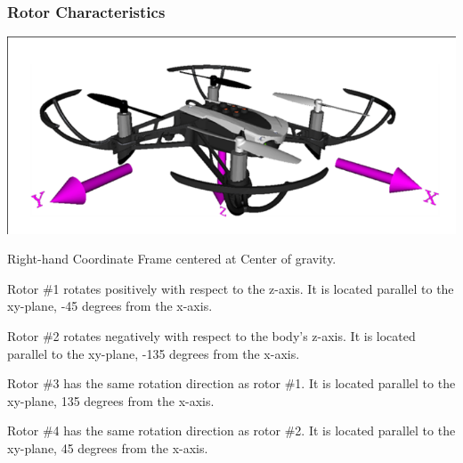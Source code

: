 \documentclass[unrestricted]{meetingnotesminutes}
\begin{document}
\subsubsection{Rotor Characteristics}
\label{sec:orgbbc489e}

\begin{center}
\includegraphics[width=.9\linewidth]{./images/screenshot-04.png}
\end{center}

Right-hand Coordinate Frame centered at Center of gravity.

Rotor \#1 rotates positively with respect to the z-axis. It is located parallel to the xy-plane, -45 degrees from the x-axis.

Rotor \#2 rotates negatively with respect to the body's z-axis. It is located parallel to the xy-plane, -135 degrees from the x-axis.

Rotor \#3 has the same rotation direction as rotor \#1. It is located parallel to the xy-plane, 135 degrees from the x-axis.

Rotor \#4 has the same rotation direction as rotor \#2. It is located parallel to the xy-plane, 45 degrees from the x-axis.
\end{document}
